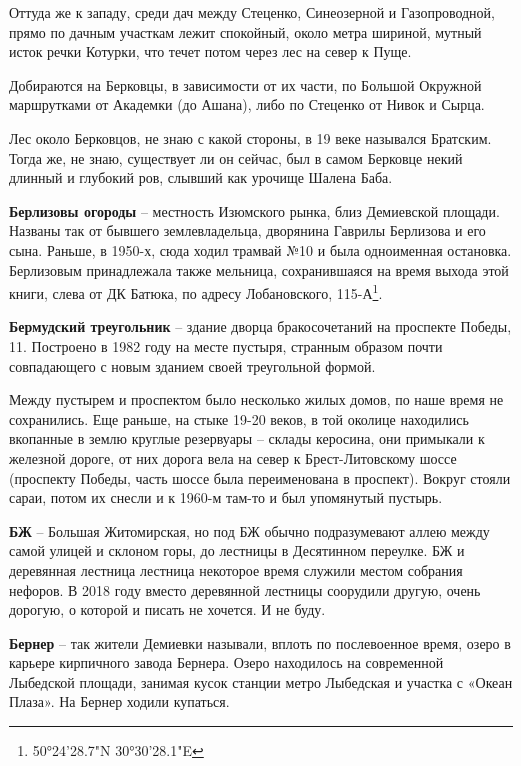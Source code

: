 Оттуда же к западу, среди дач между Стеценко, Синеозерной и Газопроводной, прямо по дачным участкам лежит спокойный, около метра шириной, мутный исток речки Котурки, что течет потом через лес на север к Пуще.

Добираются на Берковцы, в зависимости от их части, по Большой Окружной маршрутками от Академки (до Ашана), либо по Стеценко от Нивок и Сырца.

Лес около Берковцов, не знаю с какой стороны, в 19 веке назывался Братским. Тогда же, не знаю, существует ли он сейчас, был в самом Берковце некий длинный и глубокий ров, слывший как урочище Шалена Баба.\\

\medskip

\textbf{Берлизовы огороды} – местность Изюмского рынка, близ Демиевской площади. Названы так от бывшего землевладельца, дворянина Гаврилы Берлизова и его сына. Раньше, в 1950-х, сюда ходил трамвай №10 и была одноименная остановка. Берлизовым принадлежала также мельница, сохранившаяся на время выхода этой книги, слева от ДК Батюка, по адресу Лобановского, 115-А\footnote{50°24'28.7"N 30°30'28.1"E}.\\

\medskip

\textbf{Бермудский треугольник} – здание дворца бракосочетаний на проспекте Победы, 11. Построено в 1982 году на месте пустыря, странным образом почти совпадающего с новым зданием своей треугольной формой.

Между пустырем и проспектом было несколько жилых домов, по наше время не сохранились. Еще раньше, на стыке 19-20 веков, в той околице находились вкопанные в землю круглые резервуары – склады керосина, они примыкали к железной дороге, от них дорога вела на север к Брест-Литовскому шоссе (проспекту Победы, часть шоссе была переименована в проспект). Вокруг стояли сараи, потом их снесли и к 1960-м там-то и был упомянутый пустырь.\\

\medskip

\textbf{БЖ} – Большая Житомирская, но под БЖ обычно подразумевают аллею между самой улицей и склоном горы, до лестницы в Десятинном переулке. БЖ и деревянная лестница лестница некоторое время служили местом собрания нефоров. В 2018 году вместо деревянной лестницы соорудили другую, очень дорогую, о которой и писать не хочется. И не буду.\\

\medskip

\textbf{Бернер} – так жители Демиевки называли, вплоть по послевоенное время, озеро в карьере кирпичного завода Бернера. Озеро находилось на современной Лыбедской площади, занимая кусок станции метро Лыбедская и участка с «Океан Плаза». На Бернер ходили купаться.\\


